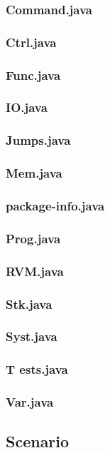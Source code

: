 \documentclass[a4paper]{article}
\begin{document}
		\subsubsection{ Command.java }
		\subsubsection{ Ctrl.java }
		\subsubsection{ Func.java }
		\subsubsection{ IO.java }
		\subsubsection{ Jumps.java }
		\subsubsection{ Mem.java }
		\subsubsection{ package-info.java }
		\subsubsection{ Prog.java }
		\subsubsection{ RVM.java }
		\subsubsection{ Stk.java }
		\subsubsection{ Syst.java }
		\subsubsection{ T ests.java }
		\subsubsection{ Var.java }
		
	\subsection{Scenario}
\end{document}
